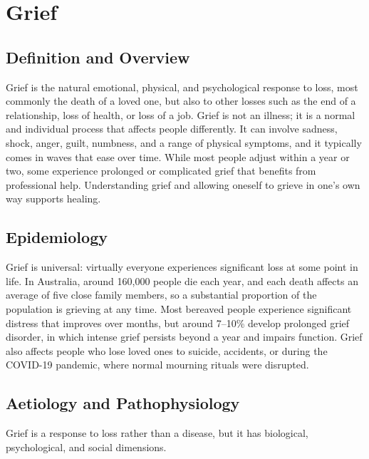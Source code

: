 \chapter{Grief}

\section*{Definition and Overview}
Grief is the natural emotional, physical, and psychological response to loss, most commonly the death of a loved one, but also to other losses such as the end of a relationship, loss of health, or loss of a job. Grief is not an illness; it is a normal and individual process that affects people differently. It can involve sadness, shock, anger, guilt, numbness, and a range of physical symptoms, and it typically comes in waves that ease over time. While most people adjust within a year or two, some experience prolonged or complicated grief that benefits from professional help. Understanding grief and allowing oneself to grieve in one's own way supports healing.

\section*{Epidemiology}
Grief is universal: virtually everyone experiences significant loss at some point in life. In Australia, around 160,000 people die each year, and each death affects an average of five close family members, so a substantial proportion of the population is grieving at any time. Most bereaved people experience significant distress that improves over months, but around 7--10\% develop prolonged grief disorder, in which intense grief persists beyond a year and impairs function. Grief also affects people who lose loved ones to suicide, accidents, or during the COVID-19 pandemic, where normal mourning rituals were disrupted.

\section*{Aetiology and Pathophysiology}
Grief is a response to loss rather than a disease, but it has biological, psychological, and social dimensions.

